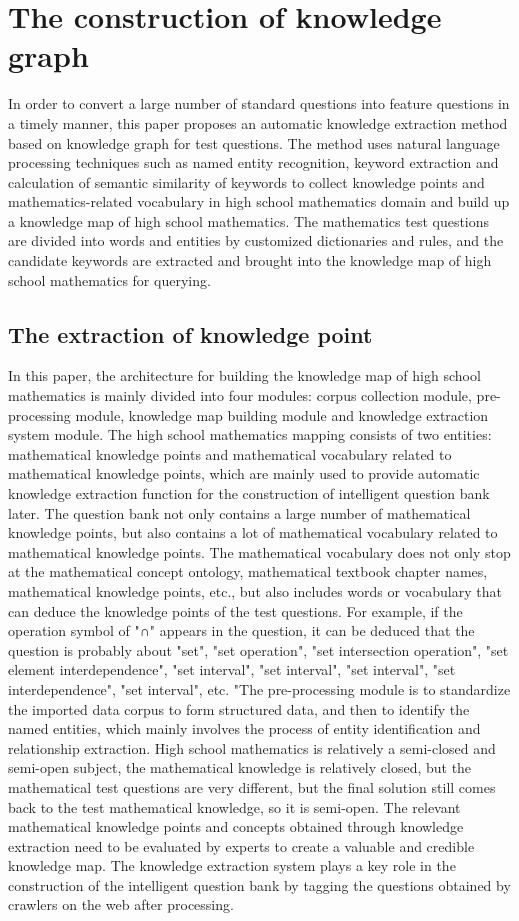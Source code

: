 \section{The construction of knowledge graph}
In order to convert a large number of standard questions into feature questions in a timely manner, this paper proposes an automatic knowledge extraction method based on knowledge graph for test questions. The method uses natural language processing techniques such as named entity recognition, keyword extraction and calculation of semantic similarity of keywords to collect knowledge points and mathematics-related vocabulary in high school mathematics domain and build up a knowledge map of high school mathematics. The mathematics test questions are divided into words and entities by customized dictionaries and rules, and the candidate keywords are extracted and brought into the knowledge map of high school mathematics for querying.

\subsection{The extraction of knowledge point}
In this paper, the architecture for building the knowledge map of high school mathematics is mainly divided into four modules: corpus collection module, pre-processing module, knowledge map building module and knowledge extraction system module. The high school mathematics mapping consists of two entities: mathematical knowledge points and mathematical vocabulary related to mathematical knowledge points, which are mainly used to provide automatic knowledge extraction function for the construction of intelligent question bank later. The question bank not only contains a large number of mathematical knowledge points, but also contains a lot of mathematical vocabulary related to mathematical knowledge points. The mathematical vocabulary does not only stop at the mathematical concept ontology, mathematical textbook chapter names, mathematical knowledge points, etc., but also includes words or vocabulary that can deduce the knowledge points of the test questions. For example, if the operation symbol of "∩" appears in the question, it can be deduced that the question is probably about "set", "set operation", "set intersection operation", "set element interdependence", "set interval", "set interval", "set interval", "set interdependence", "set interval", etc. "The pre-processing module is to standardize the imported data corpus to form structured data, and then to identify the named entities, which mainly involves the process of entity identification and relationship extraction. High school mathematics is relatively a semi-closed and semi-open subject, the mathematical knowledge is relatively closed, but the mathematical test questions are very different, but the final solution still comes back to the test mathematical knowledge, so it is semi-open. The relevant mathematical knowledge points and concepts obtained through knowledge extraction need to be evaluated by experts to create a valuable and credible knowledge map. The knowledge extraction system plays a key role in the construction of the intelligent question bank by tagging the questions obtained by crawlers on the web after processing. 


